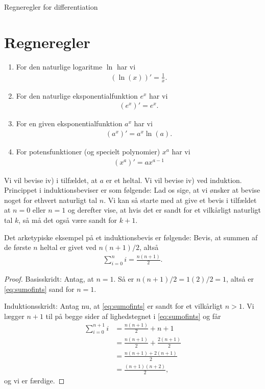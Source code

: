 
\begin{center}
\Huge
Regneregler for differentiation
\end{center}
\section*{Regneregler}

\begin{setn}
\begin{enumerate}[label=\roman*)]
\item For den naturlige logaritme $\ln$ har vi
\begin{align*}
(\ln(x))' = \frac{1}{x}.
\end{align*}
\item For den naturlige eksponentialfunktion $e^x$ har vi
\begin{align*}
(e^x)' = e^x.
\end{align*}
\item For en given eksponentialfunktion $a^x$ har vi
\begin{align*}
(a^x)' = a^x\ln(a).
\end{align*}
\item For potensfunktioner (og specielt polynomier) $x^a$ har vi
\begin{align*}
(x^a)' = ax^{a-1}
\end{align*}
\end{enumerate}
\end{setn}
Vi vil bevise iv) i tilfældet, at $a$ er et heltal. Vi vil bevise iv) ved induktion. Princippet i induktionsbeviser er som følgende: Lad os sige, at vi ønsker at bevise noget for ethvert naturligt tal $n$. Vi kan så starte med at give et bevis i tilfældet at $n=0$ eller $n=1$ og derefter vise, at hvis det er sandt for et vilkårligt naturligt tal $k$, så må det også være sandt for $k+1$.
\begin{exa}
Det arketypiske eksempel på et induktionsbevis er følgende: Bevis, at summen af de første $n$ heltal er givet ved $n(n+1)/2$, altså
\begin{align}\label{eq:sumofints}
\sum_{i=0}^n i = \frac{n(n+1)}{2}.
\end{align}
\begin{proof}
Basisskridt: Antag, at $n=1$. Så er $n(n+1)/2 = 1(2)/2=1$, altså er \eqref{eq:sumofints} sand for $n=1$. 


Induktionsskridt: Antag nu, at \eqref{eq:sumofints} er sandt for et vilkårligt $n>1$. Vi lægger $n+1$ til på begge sider af lighedstegnet i \eqref{eq:sumofints} og får
\begin{align*}
\sum_{i=0}^{n+1} i &= \frac{n(n+1)}{2} +n+1 \\
&= \frac{n(n+1)}{2}+\frac{2(n+1)}{2}\\
&= \frac{n(n+1)+2(n+1)}{2}\\
&= \frac{(n+1)(n+2)}{2},
\end{align*}
og vi er færdige.
\end{proof}
\end{exa} 

